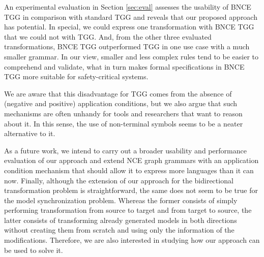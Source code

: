 \documentclass[runningheads]{llncs}
\begin{document}
An experimental evaluation in Section \ref{sec:eval} assesses the usability of BNCE TGG in comparison with standard TGG and reveals that our proposed approach has potential. In special, we could express one transformation with BNCE TGG that we could not with TGG. And, from the other three evaluated transformations, BNCE TGG outperformed TGG in one use case with a much smaller grammar. In our view, smaller and less complex rules tend to be easier to comprehend and validate, what in turn makes formal specifications in BNCE TGG more suitable for safety-critical systems.

We are aware that this disadvantage for TGG comes from the absence of (negative and positive) application conditions, but we also argue that such mechanisms are often unhandy for tools and researchers that want to reason about it. In this sense, the use of non-terminal symbols seems to be a neater alternative to it.

As a future work, we intend to carry out a broader usability and performance evaluation of our approach and extend NCE graph grammars with an application condition mechanism that should allow it to express more languages than it can now. Finally, although the extension of our approach for the bidirectional transformation problem is straightforward, the same does not seem to be true for the model synchronization problem. Whereas the former consists of simply performing transformation from source to target and from target to source, the latter consists of transforming already generated models in both directions without creating them from scratch and using only the information of the modifications. Therefore, we are also interested in studying how our approach can be used to solve it.

%
%
%


\end{document}
